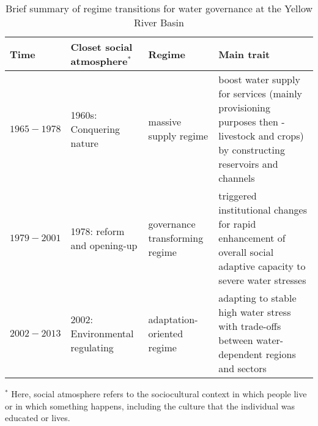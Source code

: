 \begin{table}[htbp]
    \centering
    \caption{Brief summary of regime transitions for water governance at the Yellow River Basin}
      \begin{tabularx}{\textwidth}{p{} p{} p{} p{}}
      \toprule
      Time  & Closet social atmosphere$^*$ & Regime & Main trait \\
      \midrule
      $1965-1978$ & 1960s: Conquering nature & massive supply regime & boost water supply for services (mainly provisioning purposes then -livestock and crops) by constructing reservoirs and channels \\
      $1979-2001$ & 1978: reform and opening-up & governance transforming regime & triggered institutional changes for rapid enhancement of overall social adaptive capacity to severe water stresses \\
      $2002-2013$ & 2002: Environmental regulating & adaptation-oriented regime & adapting to stable high water stress with trade-offs between water-dependent regions and sectors \\
      \bottomrule
      \end{tabularx}\label{tab:regimes}%

      \footnotesize
      $^*$ Here, social atmosphere refers to the sociocultural context in which people live or in which something happens, including the culture that the individual was educated or lives.
  \end{table}%
